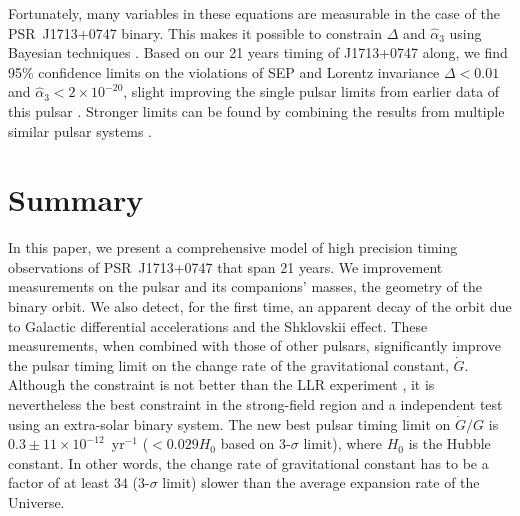 Fortunately, many variables in these equations are measurable in the
case of the PSR~J1713+0747 binary. This makes it possible to constrain $\Delta$
and $\hat{\alpha}_3$ using Bayesian techniques 
\citep{sns+05, sfl+05, gsf+11}. Based on our 21 years 
timing of J1713+0747 along, we find 95\% confidence limits on the violations of SEP and
Lorentz invariance $\Delta < 0.01$ and $\hat{\alpha}_3<2\times10^{-20}$, 
slight improving the single pulsar limits from earlier data of this pulsar \citep{sfl+05, gsf+11}.
Stronger limits can be found by combining the results from
multiple similar pulsar systems \citep{wex00,sfl+05, gsf+11}.


\section{Summary}
In this paper, we present a comprehensive model of high precision timing observations of
PSR~J1713+0747 that span 21 years. 
We improvement measurements on the pulsar and its companions' masses, the
geometry of the binary orbit. We also detect, for the first time, an apparent
decay of the orbit due to Galactic differential accelerations and the Shklovskii effect.
These measurements, when combined with those of other pulsars, 
significantly improve the pulsar timing limit on the change rate of the gravitational
 constant, $\dot{G}$. Although the constraint is not better than the
 LLR experiment \citep{hmb10}, it is nevertheless the best constraint in
the strong-field region and a independent test using an extra-solar binary system.
The new best pulsar timing limit on $\dot{G}/G$ is 
$0.3\pm11\times10^{-12}$~yr$^{-1}$ ($<0.029H_0$ based on 3-$\sigma$ limit), where $H_0$ is the Hubble constant. 
In other words, the change rate of gravitational constant has to be a factor
of at least $34$ (3-$\sigma$ limit) slower than the average expansion rate of
the Universe.

